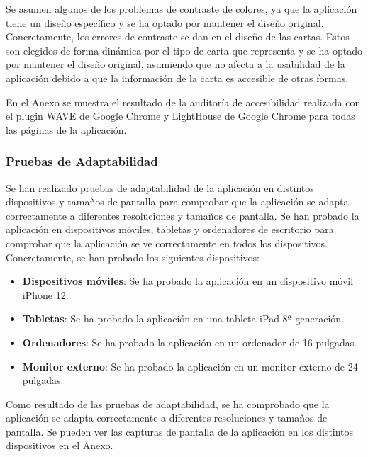 Se asumen algunos de los problemas de contraste de colores, ya que la aplicación tiene un diseño específico y se ha optado por mantener el diseño original.
Concretamente, los errores de contraste se dan en el diseño de las cartas. Estos son elegidos de forma dinámica por el tipo de carta que representa y se ha optado por mantener el diseño original,
asumiendo que no afecta a la usabilidad de la aplicación debido a que la información de la carta es accesible de otras formas.

En el Anexo se muestra el resultado de la auditoría de accesibilidad realizada con el plugin WAVE de Google Chrome y LightHouse de Google Chrome para todas las páginas de la aplicación.




\subsubsection{Pruebas de Adaptabilidad}
Se han realizado pruebas de adaptabilidad de la aplicación en distintos dispositivos y tamaños de pantalla para comprobar que la aplicación se adapta correctamente a diferentes resoluciones y tamaños de pantalla.
Se han probado la aplicación en dispositivos móviles, tabletas y ordenadores de escritorio para comprobar que la aplicación se ve correctamente en todos los dispositivos.
Concretamente, se han probado los siguientes dispositivos:
\begin{itemize}
    \item \textbf{Dispositivos móviles}: Se ha probado la aplicación en un dispositivo móvil iPhone 12.
    \item \textbf{Tabletas}: Se ha probado la aplicación en una tableta iPad 8ª generación.
    \item \textbf{Ordenadores}: Se ha probado la aplicación en un ordenador de 16 pulgadas.
    \item \textbf{Monitor externo}: Se ha probado la aplicación en un monitor externo de 24 pulgadas.
\end{itemize}

Como resultado de las pruebas de adaptabilidad, se ha comprobado que la aplicación se adapta correctamente a diferentes resoluciones y tamaños de pantalla.
Se pueden ver las capturas de pantalla de la aplicación en los distintos dispositivos en el Anexo.